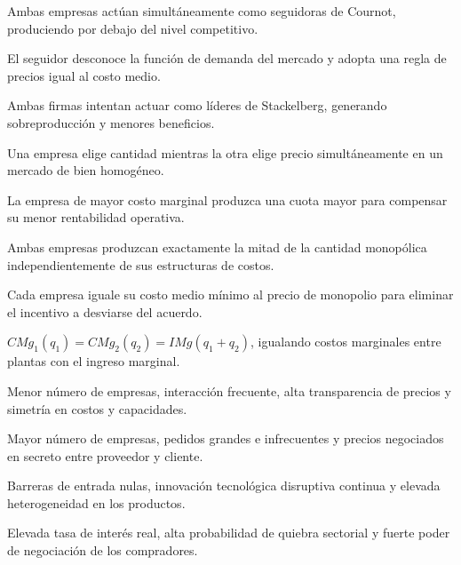 \begin{opts}
    \item Ambas empresas actúan simultáneamente como seguidoras de Cournot, produciendo por debajo del nivel competitivo.
    \item El seguidor desconoce la función de demanda del mercado y adopta una regla de precios igual al costo medio.
    \item Ambas firmas intentan actuar como líderes de Stackelberg, generando sobreproducción y menores beneficios.
    \item Una empresa elige cantidad mientras la otra elige precio simultáneamente en un mercado de bien homogéneo.
\end{opts}

\begin{opts}
    \item La empresa de mayor costo marginal produzca una cuota mayor para compensar su menor rentabilidad operativa.
    \item Ambas empresas produzcan exactamente la mitad de la cantidad monopólica independientemente de sus estructuras de costos.
    \item Cada empresa iguale su costo medio mínimo al precio de monopolio para eliminar el incentivo a desviarse del acuerdo.
    \item $CMg_1(q_1) = CMg_2(q_2) = IMg(q_1 + q_2)$, igualando costos marginales entre plantas con el ingreso marginal.
\end{opts}

\begin{opts}
    \item Menor número de empresas, interacción frecuente, alta transparencia de precios y simetría en costos y capacidades.
    \item Mayor número de empresas, pedidos grandes e infrecuentes y precios negociados en secreto entre proveedor y cliente.
    \item Barreras de entrada nulas, innovación tecnológica disruptiva continua y elevada heterogeneidad en los productos.
    \item Elevada tasa de interés real, alta probabilidad de quiebra sectorial y fuerte poder de negociación de los compradores.
\end{opts}

